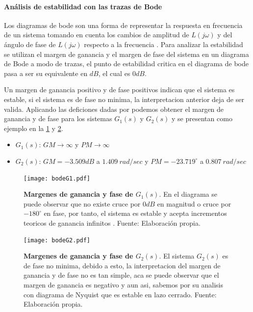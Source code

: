            \paragraph{Análisis de estabilidad con las trazas de Bode}

                Los diagramas de bode son una forma de representar la respuesta en frecuencia de un sistema tomando en cuenta los cambios de amplitud de $L(j\omega)$ y del ángulo de fase de $L(j\omega)$ respecto a la frecuencia \Parencite{nilsson1995circuitos}. Para analizar la estabilidad se utilizan el margen de ganancia y el margen de fase del sistema en un diagrama de Bode a modo de trazas, el punto de estabilidad critica en el diagrama de bode pasa a ser su equivalente en $dB$, el cual es $0dB$.

                Un margen de ganancia positivo y de fase positivos indican que el sistema es estable, si el sistema es de fase no minima, la interpretacion anterior deja de ser valida. Aplicando las deficiones dadas por \textcite{dorf2011modern} podemos obtener el margen de ganancia y de fase para los sistemas $G_1(s)$ y $G_2(s)$ y se presentan como ejemplo en la \cref{fig:bodeG1} y \cref{fig:bodeG2}.

                \begin{itemize}[leftmargin=\parindent]
                    \item $G_1(s)$: $GM \rightarrow \infty$ y $PM \rightarrow \infty$
                    \item $G_2(s)$: $GM = -3.509dB$ a $1.409\ rad/sec$ y $PM = -23.719^\circ$ a $0.807\ rad/sec$
                \end{itemize}

                \begin{figure}[htb]
                    \centering
                    \texttt{[image: bodeG1.pdf]}
                    \caption[Ejemplo 1 margenes de ganancia y fase]{\textbf{Margenes de ganancia y fase de $G_1(s)$}. En el diagrama se puede observar que no existe cruce por $0dB$ en magnitud o cruce por $-180^\circ$ en fase, por tanto, el sistema es estable y acepta incrementos teoricos de ganancia infinitos . Fuente: Elaboración propia.}
                    \label{fig:bodeG1}
                \end{figure}

                \begin{figure}[htb]
                    \centering
                    \texttt{[image: bodeG2.pdf]}
                    \caption[Ejemplo 2 margenes de ganancia y fase]{\textbf{Margenes de ganancia y fase de $G_2(s)$}. El sistema $G_2(s)$ es de fase no minima, debido a esto, la interpretacion del margen de ganancia y de fase no es tan simple, aca se puede observar que el margen de ganancia es negativo y aun asi, sabemos por su analisis con diagrama de Nyquist que es estable en lazo cerrado. Fuente: Elaboración propia.} 
                    \label{fig:bodeG2}
                \end{figure}
            

